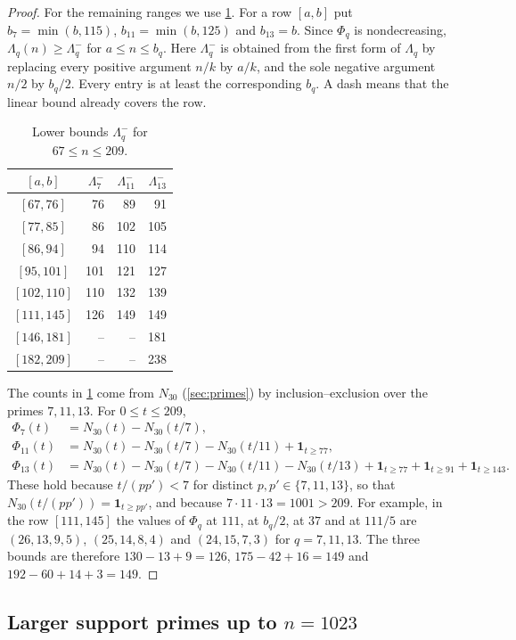 \begin{proof}
For the remaining ranges we use \cref{tab:small-q}. For a row $[a,b]$ put $b_7=\min(b,115)$, $b_{11}=\min(b,125)$ and $b_{13}=b$. Since $\Phi_q$ is nondecreasing, $\Lambda_q(n)\ge\Lambda^-_q$ for $a\le n\le b_q$. Here $\Lambda^-_q$ is obtained from the first form of $\Lambda_q$ by replacing every positive argument $n/k$ by $a/k$, and the sole negative argument $n/2$ by $b_q/2$. Every entry is at least the corresponding $b_q$. A dash means that the linear bound already covers the row.

\begin{table}[ht]
\centering\small
\caption{Lower bounds $\Lambda^-_q$ for $67\le n\le209$.}\label{tab:small-q}
\begin{tabular}{c|rrr}
\toprule
$[a,b]$&$\Lambda^-_7$&$\Lambda^-_{11}$&$\Lambda^-_{13}$\\\midrule
$[67,76]$&76&89&91\\
$[77,85]$&86&102&105\\
$[86,94]$&94&110&114\\
$[95,101]$&101&121&127\\
$[102,110]$&110&132&139\\
$[111,145]$&126&149&149\\
$[146,181]$&--&--&181\\
$[182,209]$&--&--&238\\\bottomrule
\end{tabular}
\end{table}

The counts in \cref{tab:small-q} come from $N_{30}$ (\cref{sec:primes}) by inclusion--exclusion over the primes $7,11,13$. For $0\le t\le209$,
\begin{align*}
 \Phi_7(t)&=N_{30}(t)-N_{30}(t/7),\\
 \Phi_{11}(t)&=N_{30}(t)-N_{30}(t/7)-N_{30}(t/11)+\mathbf 1_{t\ge77},\\
 \Phi_{13}(t)&=N_{30}(t)-N_{30}(t/7)-N_{30}(t/11)-N_{30}(t/13)+\mathbf 1_{t\ge77}+\mathbf 1_{t\ge91}+\mathbf 1_{t\ge143}.
\end{align*}
These hold because $t/(pp')<7$ for distinct $p,p'\in\{7,11,13\}$, so that $N_{30}(t/(pp'))=\mathbf 1_{t\ge pp'}$, and because $7\cdot11\cdot13=1001>209$. For example, in the row $[111,145]$ the values of $\Phi_q$ at $111$, at $b_q/2$, at $37$ and at $111/5$ are $(26,13,9,5)$, $(25,14,8,4)$ and $(24,15,7,3)$ for $q=7,11,13$. The three bounds are therefore $130-13+9=126$, $175-42+16=149$ and $192-60+14+3=149$.
\end{proof}

\subsection{Larger support primes up to \texorpdfstring{$n=1023$}{n = 1023}}

